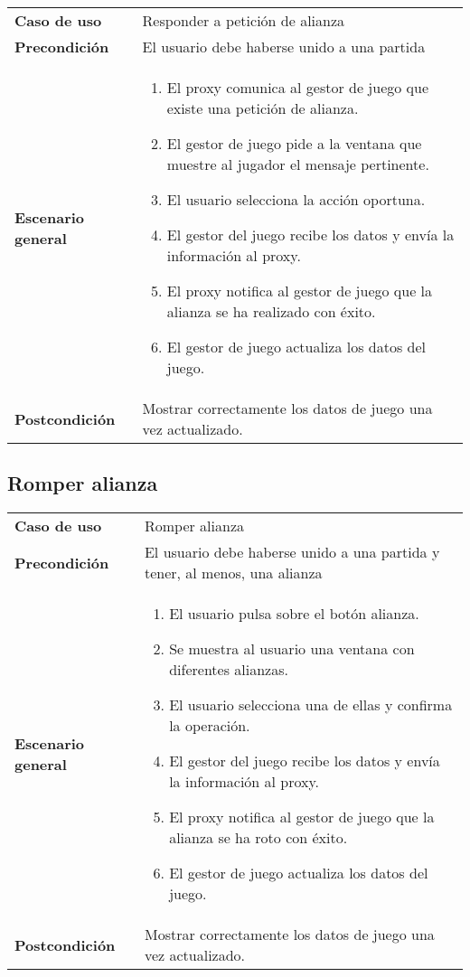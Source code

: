 {\footnotesize
\begin{tabularx}{0.95\textwidth}{p{}|X}
\textbf{Caso de uso} & Responder a petición de alianza \\

\textbf{Precondición} & El usuario debe haberse unido a una partida \\

\textbf{Escenario general} & \begin{enumerate}
\item El proxy comunica al gestor de juego que existe una petición de alianza.
\item El gestor de juego pide a la ventana que muestre al jugador el mensaje
pertinente.
\item El usuario selecciona la acción oportuna.
\item El gestor del juego recibe los datos y envía la información al proxy.
\item El proxy notifica al gestor de juego que la alianza se ha realizado con
éxito.
\item El gestor de juego actualiza los datos del juego.
\end{enumerate} \\
\textbf{Postcondición} & Mostrar correctamente los datos de juego una vez
actualizado.
\end{tabularx}
}

\subsection{Romper alianza}

{\footnotesize
\begin{tabularx}{0.95\textwidth}{p{}|X}

\textbf{Caso de uso} & Romper alianza \\

\textbf{Precondición} & El usuario debe haberse unido a una partida y tener, al
menos, una alianza \\

\textbf{Escenario general} & \begin{enumerate}
\item El usuario pulsa sobre el botón alianza.
\item Se muestra al usuario una ventana con diferentes alianzas.
\item El usuario selecciona una de ellas y confirma la operación.
\item El gestor del juego recibe los datos y envía la información al proxy.
\item El proxy notifica al gestor de juego que la alianza se ha roto con éxito.
\item El gestor de juego actualiza los datos del juego.
\end{enumerate} \\

\textbf{Postcondición} & Mostrar correctamente los datos de juego una vez
actualizado.

\end{tabularx}
}

